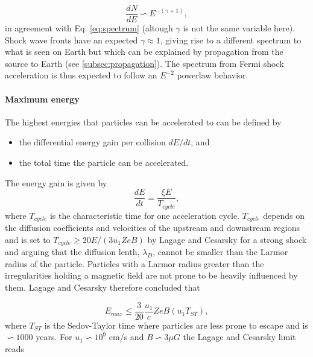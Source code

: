 \begin{equation}
\frac{dN}{dE} \backsim E^{-(\gamma + 1)},
\end{equation}
in agreement with Eq. \ref{eq:spectrum} (altough $\gamma$ is not the same variable here). Shock wave fronts have an expected $\gamma \approx 1$, giving rise to a different spectrum to what is seen on Earth but which can be explained by propagation from the source to Earth (see \ref{subsec:propagation}). The spectrum from Fermi shock acceleration is thus expected to follow an $E^{-2}$ powerlaw behavior.

\paragraph{Maximum energy}
\label{para:maxenergy}
The highest energies that particles can be accelerated to can be defined by

\begin{itemize}
\item the differential energy gain per collision $dE/dt$, and
\item the total time the particle can be accelerated.
\end{itemize}
\vspace{2mm}
\noindent The energy gain is given by
\begin{equation}
\frac{dE}{dt} = \frac{\xi E}{T_{cycle}},
\end{equation}
where $T_{cycle}$ is the characteristic time for one acceleration cycle. $T_{cycle}$ depends on the diffusion coefficients and velocities of the upstream and downstream regions and is set to $T_{cycle} \geq 20 E/(3 u_1 Z e B)$ by Lagage and Cesarsky \cite{Lagage:1983zz} for a strong shock and arguing that the diffusion lenth, $\lambda_D$, cannot be smaller than the Larmor radius of the particle. Particles with a Larmor radius greater than the irregularities holding a magnetic field are not prone to be heavily influenced by them. Lagage and Cesarsky therefore concluded that

\begin{equation}
E_{max} \leq \frac{3}{20} \frac{u_1}{c} Z e B (u_1 T_{ST}),
\end{equation}
where $T_{ST}$ is the Sedov-Taylor time where particles are less prone to escape and is $\backsim 1000$ years. For $u_1 \backsim 10^9$ cm/s \cite{stanev2010high}  and $B \backsim 3\mu G$ the Lagage and Cesarsky limit reads


